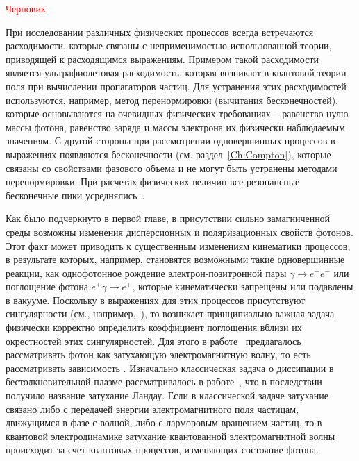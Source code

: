 \textcolor{red}{Черновик}

При исследовании различных физических процессов всегда встречаются расходимости, которые связаны с неприменимостью использованной теории, приводящей к расходящимся выражениям. Примером такой расходимости является ультрафиолетовая расходимость, которая возникает в квантовой теории поля при вычислении пропагаторов частиц. Для устранения этих расходимостей используются, например, метод перенормировки (вычитания бесконечностей), которые основываются на очевидных физических требованиях -- равенство нулю массы фотона, равенство заряда и массы электрона их физически наблюдаемым значениям. С другой стороны при рассмотрении одновершинных процессов в выражениях появляются  бесконечности (см. раздел~\ref{Ch:Compton}), которые связаны со свойствами фазового объема и не могут быть устранены методами перенормировки.
При расчетах физических величин все резонансные бесконечные пики усреднялись~\cite{Baier:2007}.

Как было подчеркнуто в первой главе, в присутствии сильно замагниченной среды 
возможны изменения дисперсионных и поляризационных свойств фотонов. Этот факт 
может приводить к существенным изменениям кинематики процессов, в результате 
которых, например, становятся возможными такие одновершинные реакции, как однофотонное 
рождение электрон-позитронной пары $\gamma\to e^+e^-$ или поглощение фотона 
$e^{\pm}\gamma\to e^{\pm}$, которые кинематически запрещены или подавлены в 
вакууме. Поскольку в выражениях для этих процессов присутствуют сингулярности (см., например,~\cite{Klepikov:1954,Sturrock:1971,Tademaru:1973,Daugherty:1983,Shabad:1988}), то возникает принципиально важная задача физически корректно определить коэффициент поглощения вблизи их окрестностей этих сингулярностей.
Для этого в работе~\cite{Shabad:1988} предлагалось рассматривать фотон как затухающую электромагнитную волну, то есть рассматривать зависимость . Изначально классическая задача о диссипации  в бестолкновительной плазме рассматривалось в работе~\cite{Landau:1946}, что в последствии получило название затухание Ландау. Если в классической задаче затухание связано либо с передачей энергии электромагнитного поля частицам, движущимся в фазе с волной, либо с ларморовым вращением частиц, то в квантовой электродинамике затухание квантованной электромагнитной волны происходит за счет квантовых процессов, изменяющих состояние фотона.

